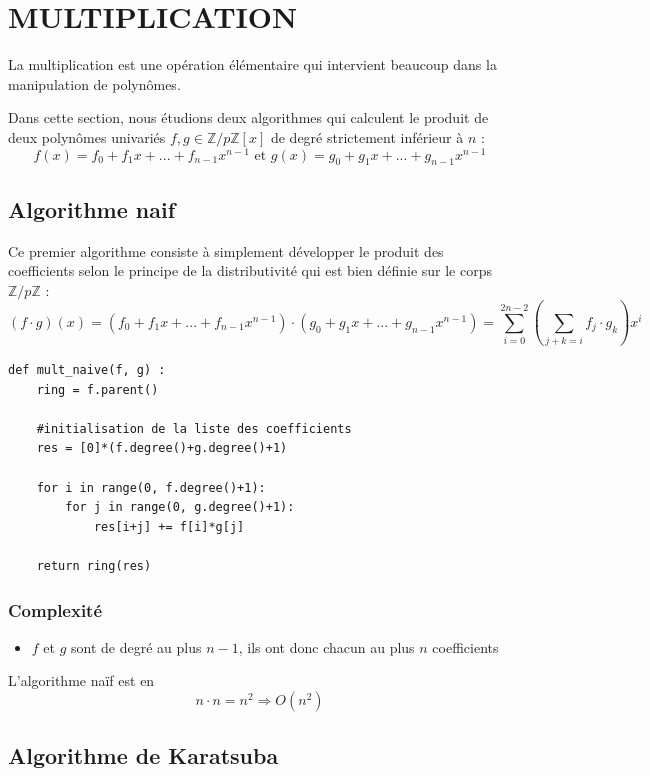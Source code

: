 \documentclass[a4paper]{article}
\begin{document}
\section{MULTIPLICATION}

La multiplication est une opération élémentaire qui intervient beaucoup dans la manipulation de polynômes.

Dans cette section, nous étudions deux algorithmes qui calculent le produit de deux polynômes univariés $f,g \in \mathbb{Z}/p\mathbb{Z}[x]$ de degré strictement inférieur à $n$ :
\[
f(x)=f_0+f_1x+...+f_{n-1}x^{n-1}\text{ et }g(x)=g_0+g_1x+...+g_{n-1}x^{n-1}
\]

\subsection{Algorithme naif}

Ce premier algorithme consiste à simplement développer le produit des coefficients selon le principe de la distributivité qui est bien définie sur le corps $\mathbb{Z}/p\mathbb{Z}$ :
\[
(f\cdot g)(x)=(f_0+f_1x+...+f_{n-1}x^{n-1})\cdot (g_0+g_1x+...+g_{n-1}x^{n-1})=\sum_{i=0}^{2n-2} (\sum_{j+k=i}f_j\cdot g_k) x^i
\]

\begin{lstlisting}[title={multiplication naive}]
    def mult_naive(f, g) :
    ring = f.parent()

    #initialisation de la liste des coefficients
    res = [0]*(f.degree()+g.degree()+1) 
    
    for i in range(0, f.degree()+1):
        for j in range(0, g.degree()+1):
            res[i+j] += f[i]*g[j]

    return ring(res) 
\end{lstlisting}

\subsubsection*{Complexité}
\begin{itemize} 
    \item $f$ et $g$ sont de degré au plus $n-1$, ils ont donc chacun au plus $n$ coefficients
\end{itemize}
L'algorithme naïf est en $$n\cdot n = n^2 \Longrightarrow O(n^2)$$

\subsection{Algorithme de Karatsuba}
\end{document}
